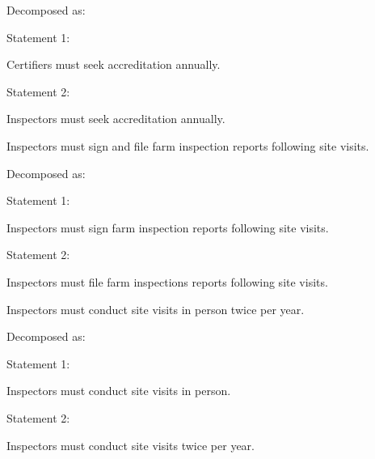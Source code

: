 \begin{landscape}
\begin{longtable}{\tabledims}
\sp 

Decomposed as:

\sp

Statement 1: \begin{exi}Certifiers must seek accreditation annually.\end{exi}

\AND

Statement 2: \begin{exi}Inspectors must seek accreditation annually.\end{exi}

\sp


\begin{exi}Inspectors must sign and file farm inspection reports following site visits.\end{exi}

\sp

Decomposed as:

\sp

Statement 1: \begin{exi}Inspectors must sign farm inspection reports following site visits.\end{exi}

\AND

Statement 2: \begin{exi}Inspectors must file farm inspections reports following site visits.\end{exi}


\sp

\sp


\begin{exi}Inspectors must conduct site visits in person twice per year.\end{exi}

\sp

Decomposed as:

\sp

Statement 1: \begin{exi}Inspectors must conduct site visits in person.\end{exi}

\AND

Statement 2: \begin{exi}Inspectors must conduct site visits twice per year.\end{exi}


\\


\end{longtable}
\end{landscape}
